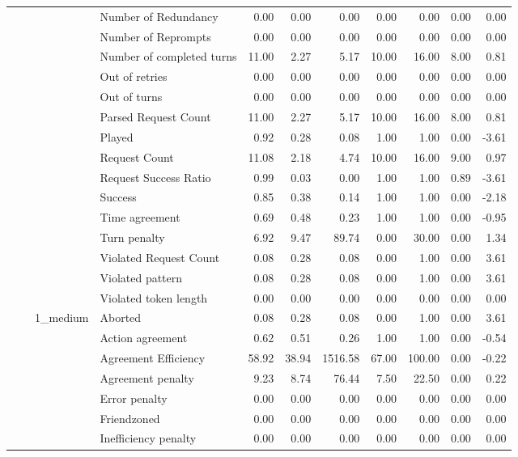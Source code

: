 \begin{tabular}{llllrrrrrrr}
 &  &  & Number of Redundancy & 0.00 & 0.00 & 0.00 & 0.00 & 0.00 & 0.00 & 0.00 \\
 &  &  & Number of Reprompts & 0.00 & 0.00 & 0.00 & 0.00 & 0.00 & 0.00 & 0.00 \\
 &  &  & Number of completed turns & 11.00 & 2.27 & 5.17 & 10.00 & 16.00 & 8.00 & 0.81 \\
 &  &  & Out of retries & 0.00 & 0.00 & 0.00 & 0.00 & 0.00 & 0.00 & 0.00 \\
 &  &  & Out of turns & 0.00 & 0.00 & 0.00 & 0.00 & 0.00 & 0.00 & 0.00 \\
 &  &  & Parsed Request Count & 11.00 & 2.27 & 5.17 & 10.00 & 16.00 & 8.00 & 0.81 \\
 &  &  & Played & 0.92 & 0.28 & 0.08 & 1.00 & 1.00 & 0.00 & -3.61 \\
 &  &  & Request Count & 11.08 & 2.18 & 4.74 & 10.00 & 16.00 & 9.00 & 0.97 \\
 &  &  & Request Success Ratio & 0.99 & 0.03 & 0.00 & 1.00 & 1.00 & 0.89 & -3.61 \\
 &  &  & Success & 0.85 & 0.38 & 0.14 & 1.00 & 1.00 & 0.00 & -2.18 \\
 &  &  & Time agreement & 0.69 & 0.48 & 0.23 & 1.00 & 1.00 & 0.00 & -0.95 \\
 &  &  & Turn penalty & 6.92 & 9.47 & 89.74 & 0.00 & 30.00 & 0.00 & 1.34 \\
 &  &  & Violated Request Count & 0.08 & 0.28 & 0.08 & 0.00 & 1.00 & 0.00 & 3.61 \\
 &  &  & Violated pattern & 0.08 & 0.28 & 0.08 & 0.00 & 1.00 & 0.00 & 3.61 \\
 &  &  & Violated token length & 0.00 & 0.00 & 0.00 & 0.00 & 0.00 & 0.00 & 0.00 \\
\cline{3-11}
 &  & \multirow[t]{27}{*}{1_medium} & Aborted & 0.08 & 0.28 & 0.08 & 0.00 & 1.00 & 0.00 & 3.61 \\
 &  &  & Action agreement & 0.62 & 0.51 & 0.26 & 1.00 & 1.00 & 0.00 & -0.54 \\
 &  &  & Agreement Efficiency & 58.92 & 38.94 & 1516.58 & 67.00 & 100.00 & 0.00 & -0.22 \\
 &  &  & Agreement penalty & 9.23 & 8.74 & 76.44 & 7.50 & 22.50 & 0.00 & 0.22 \\
 &  &  & Error penalty & 0.00 & 0.00 & 0.00 & 0.00 & 0.00 & 0.00 & 0.00 \\
 &  &  & Friendzoned & 0.00 & 0.00 & 0.00 & 0.00 & 0.00 & 0.00 & 0.00 \\
 &  &  & Inefficiency penalty & 0.00 & 0.00 & 0.00 & 0.00 & 0.00 & 0.00 & 0.00 \\

\end{tabular}
